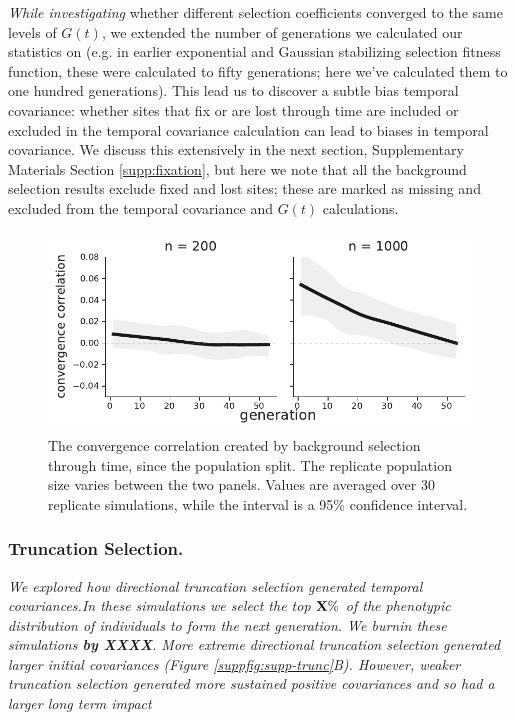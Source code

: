 \documentclass[11pt]{article}
\newcommand{\gc}[1]{{\it \color{red} #1 } }
\begin{document}
{\gc{While investigating} whether different selection coefficients converged to
the same levels of $G(t)$, we extended the number of generations we calculated
our statistics on (e.g. in earlier exponential and Gaussian stabilizing
selection fitness function, these were calculated to fifty generations; here
we've calculated them to one hundred generations). This lead us to discover a
subtle bias temporal covariance: whether sites that fix or are lost through
time are included or excluded in the temporal covariance calculation can lead
to biases in temporal covariance. We discuss this extensively in the next
section, Supplementary Materials Section \ref{supp:fixation}, but here we note
that all the background selection results exclude fixed and lost sites; these
are marked as missing and excluded from the temporal covariance and $G(t)$
calculations.

\begin{figure}[!ht]
  \centering
  \includegraphics[width=\textwidth]{figures/fig-bgs-convergence-correlation.pdf}

  \caption{The convergence correlation created by background selection through
    time, since the population split. The replicate population size varies
    between the two panels. Values are averaged over 30 replicate simulations,
    while the interval is a 95\% confidence interval.}

  \label{suppfig:supp-bgs-converg}
\end{figure}


\subsubsection{Truncation Selection.}
\gc{We explored how directional truncation selection generated
  temporal covariances.In these simulations we select the top ${\bf X
    \%}$ of the phenotypic distribution of individuals to form the
  next generation. We burnin these simulations {\bf by
    XXXX}. More extreme directional truncation selection generated
  larger initial covariances (Figure
  \ref{suppfig:supp-trunc}B). However, weaker truncation selection
  generated more sustained positive covariances and so had a larger
  long term impact 

}}
\end{document}
